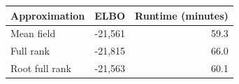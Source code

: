 \begin{tabular}{lrr}
\hline
Approximation & ELBO & Runtime (minutes) \\
\hline
Mean field & -21,561 & 59.3 \\
Full rank & -21,815 & 66.0 \\
Root full rank & -21,563 & 60.1 \\
\hline
\end{tabular}